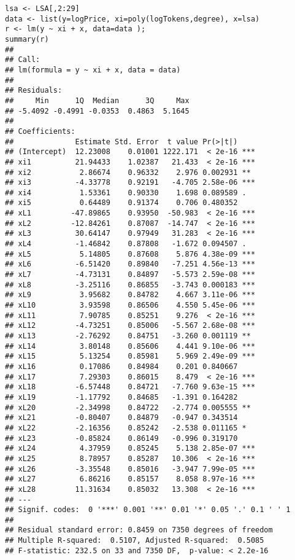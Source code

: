 \documentclass[12pt]{article}\usepackage[]{graphicx}\usepackage[]{color}
\makeatletter
\newenvironment{kframe}{%
 \def\at@end@of@kframe{}%
 \ifinner\ifhmode%
  \def\at@end@of@kframe{\end{minipage}}%
  \begin{minipage}{\columnwidth}%
 \fi\fi%
 \def\FrameCommand##1{\hskip\@totalleftmargin \hskip-\fboxsep
 \colorbox{shadecolor}{##1}\hskip-\fboxsep
     \hskip-\linewidth \hskip-\@totalleftmargin \hskip\columnwidth}%
 \MakeFramed {\advance\hsize-\width
   \@totalleftmargin\z@ \linewidth\hsize
   \@setminipage}}%
 {\par\unskip\endMakeFramed%
 \at@end@of@kframe}
\newenvironment{knitrout}{}{} %
\makeatother
\begin{document}
\begin{knitrout}
\color{fgcolor}\begin{kframe}
\begin{verbatim}
lsa <- LSA[,2:29]
data <- list(y=logPrice, xi=poly(logTokens,degree), x=lsa)
r <- lm(y ~ xi + x, data=data );
summary(r)
## 
## Call:
## lm(formula = y ~ xi + x, data = data)
## 
## Residuals:
##     Min      1Q  Median      3Q     Max 
## -5.4092 -0.4991 -0.0353  0.4863  5.1645 
## 
## Coefficients:
##              Estimate Std. Error  t value Pr(>|t|)    
## (Intercept)  12.23008    0.01001 1222.171  < 2e-16 ***
## xi1          21.94433    1.02387   21.433  < 2e-16 ***
## xi2           2.86674    0.96332    2.976 0.002931 ** 
## xi3          -4.33778    0.92191   -4.705 2.58e-06 ***
## xi4           1.53361    0.90330    1.698 0.089589 .  
## xi5           0.64489    0.91374    0.706 0.480352    
## xL1         -47.89865    0.93950  -50.983  < 2e-16 ***
## xL2         -12.84261    0.87087  -14.747  < 2e-16 ***
## xL3          30.64147    0.97949   31.283  < 2e-16 ***
## xL4          -1.46842    0.87808   -1.672 0.094507 .  
## xL5           5.14805    0.87608    5.876 4.38e-09 ***
## xL6          -6.51420    0.89840   -7.251 4.56e-13 ***
## xL7          -4.73131    0.84897   -5.573 2.59e-08 ***
## xL8          -3.25116    0.86855   -3.743 0.000183 ***
## xL9           3.95682    0.84782    4.667 3.11e-06 ***
## xL10          3.93598    0.86506    4.550 5.45e-06 ***
## xL11          7.90785    0.85251    9.276  < 2e-16 ***
## xL12         -4.73251    0.85006   -5.567 2.68e-08 ***
## xL13         -2.76292    0.84751   -3.260 0.001119 ** 
## xL14          3.80148    0.85606    4.441 9.10e-06 ***
## xL15          5.13254    0.85981    5.969 2.49e-09 ***
## xL16          0.17086    0.84984    0.201 0.840667    
## xL17          7.29303    0.86015    8.479  < 2e-16 ***
## xL18         -6.57448    0.84721   -7.760 9.63e-15 ***
## xL19         -1.17792    0.84685   -1.391 0.164282    
## xL20         -2.34998    0.84722   -2.774 0.005555 ** 
## xL21         -0.80407    0.84879   -0.947 0.343514    
## xL22         -2.16356    0.85242   -2.538 0.011165 *  
## xL23         -0.85824    0.86149   -0.996 0.319170    
## xL24          4.37959    0.85245    5.138 2.85e-07 ***
## xL25          8.78957    0.85287   10.306  < 2e-16 ***
## xL26         -3.35548    0.85016   -3.947 7.99e-05 ***
## xL27          6.86216    0.85157    8.058 8.97e-16 ***
## xL28         11.31634    0.85032   13.308  < 2e-16 ***
## ---
## Signif. codes:  0 '***' 0.001 '**' 0.01 '*' 0.05 '.' 0.1 ' ' 1
## 
## Residual standard error: 0.8459 on 7350 degrees of freedom
## Multiple R-squared:  0.5107,	Adjusted R-squared:  0.5085 
## F-statistic: 232.5 on 33 and 7350 DF,  p-value: < 2.2e-16
\end{verbatim}
\end{kframe}
\end{knitrout}
\end{document}

